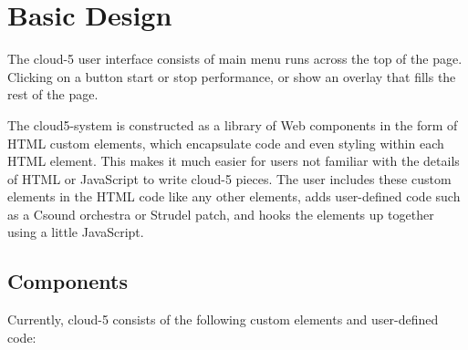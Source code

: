 \documentclass[runningheads,a4paper]{llncs}
\begin{document}
\section{Basic Design}

The cloud-5 user interface consists of main menu runs across the top of the page. Clicking on a button start or stop performance, or show an overlay that fills the rest of the page. 

The cloud5-system is constructed as a library of Web components in the form of HTML custom elements, which encapsulate code and even styling within each HTML element. This makes it much easier for users not familiar with the details of HTML or JavaScript to write cloud-5 pieces. The user includes these custom elements in the HTML code like any other elements, adds user-defined code such as a Csound orchestra or Strudel patch, and hooks the elements up together using a little JavaScript.

\subsection{Components}

Currently, cloud-5 consists of the following custom elements and user-defined code:
\end{document}
